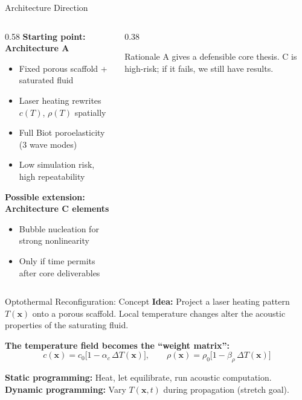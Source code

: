 \documentclass[aspectratio=169,11pt]{beamer}
\begin{document}
\begin{frame}{Architecture Direction}
  \begin{columns}[T]
    \begin{column}{0.58\textwidth}
      \textbf{Starting point: Architecture A}
      \begin{itemize}
        \item Fixed porous scaffold + saturated fluid
        \item Laser heating rewrites $c(T)$, $\rho(T)$ spatially
        \item Full Biot poroelasticity (3 wave modes)
        \item Low simulation risk, high repeatability
      \end{itemize}

      \vspace{0.2cm}
      \textbf{Possible extension: Architecture C elements}
      \begin{itemize}
        \item Bubble nucleation for strong nonlinearity
        \item Only if time permits after core deliverables
      \end{itemize}
    \end{column}
    \begin{column}{0.38\textwidth}
      \begin{block}{\footnotesize Rationale}
        \footnotesize
        A gives a defensible core thesis. C is high-risk; if it fails, we still have results.
      \end{block}
    \end{column}
  \end{columns}
\end{frame}

\begin{frame}{Optothermal Reconfiguration: Concept}
  \textbf{Idea:} Project a laser heating pattern $T(\mathbf{x})$ onto a porous scaffold. Local temperature changes alter the acoustic properties of the saturating fluid.

  \vspace{0.3cm}
  \textbf{The temperature field becomes the ``weight matrix'':}
  \[
    c(\mathbf{x}) = c_0\bigl[1 - \alpha_c\,\Delta T(\mathbf{x})\bigr], \qquad
    \rho(\mathbf{x}) = \rho_0\bigl[1 - \beta_\rho\,\Delta T(\mathbf{x})\bigr]
  \]

  \vspace{0.2cm}
  \textbf{Static programming:} Heat, let equilibrate, run acoustic computation.\\
  \textbf{Dynamic programming:} Vary $T(\mathbf{x},t)$ during propagation (stretch goal).
\end{frame}
\end{document}
